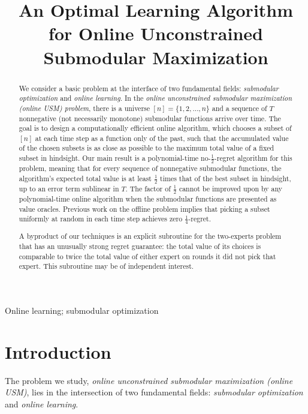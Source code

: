 \documentclass[final,12pt]{colt2018}
\title[An Optimal Algorithm for Online USM]{An Optimal Learning Algorithm for Online Unconstrained
  Submodular Maximization}
\begin{document}
\maketitle

\begin{abstract}
  We consider a basic problem at the interface of two fundamental
  fields: {\em submodular optimization} and {\em online learning}.  In
  the {\em online unconstrained submodular maximization (online USM)
  problem}, there is a universe $[n]=\{1,2,\ldots,n\}$ and a
  sequence of $T$ nonnegative (not necessarily monotone) submodular functions arrive over time.  The
  goal is to design a computationally efficient online algorithm,
  which chooses a subset of $[n]$ at each time step as a function only
  of the past, such that the accumulated value of the chosen subsets
  is as close as possible to the maximum total value of a fixed subset
  in hindsight.  Our main result is a polynomial-time 
  no-$\tfrac12$-regret algorithm for this
  problem, meaning that for every sequence of nonnegative
  submodular functions, the algorithm's expected total value is at least
  $\tfrac12$ times that of the best subset in hindsight, up to an
  error term sublinear in $T$.
  The factor of $\tfrac12$ cannot be improved upon by
  any polynomial-time online algorithm when the submodular functions are presented
  as value oracles.
  Previous work on the offline problem implies that picking a subset uniformly at
  random in each time step achieves zero $\tfrac14$-regret.

  A byproduct of our techniques is an explicit subroutine for the two-experts
  problem that has an unusually strong regret guarantee: the total value
  of its choices is comparable to twice the total value of either
  expert on rounds it did not pick that expert. This subroutine may be
  of independent interest.
\end{abstract}

\begin{keywords}
Online learning; submodular optimization
\end{keywords}

\section{Introduction}

The problem we study, {\em online unconstrained submodular maximization (online
USM)}, lies in the intersection of two fundamental fields: {\em submodular
optimization} and {\em online learning}.
\end{document}
